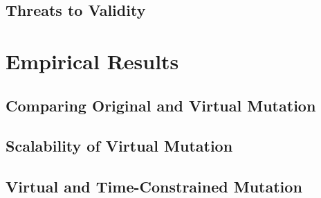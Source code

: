 
\subsection{Threats to Validity}
\label{sec:threats-to-validity}


\section{Empirical Results}
\label{sec:empirical-results}


\subsection{Comparing Original and Virtual Mutation}
\label{sec:empirical-study-RQ-original-virtual-time}



\subsection{Scalability of Virtual Mutation}
\label{sec:empirical-study-RQ-scalability-mutants-tests}



\subsection{Virtual and Time-Constrained Mutation}
\label{sec:empirical-study-RQ-virtual-time-constrained-virtual}



